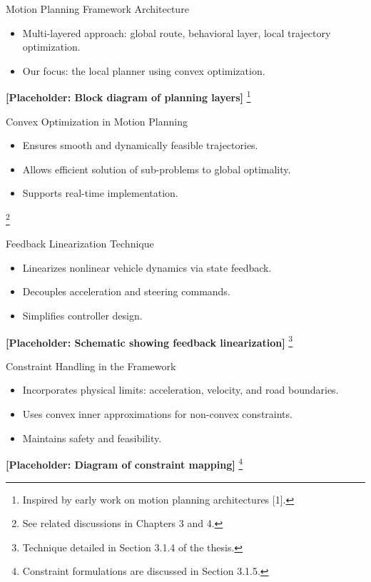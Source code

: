 \documentclass[shortpres,aspectratio=43]{beamer}
\newcommand\blfootnote[1]{%
  \begingroup
  \renewcommand\thefootnote{}\footnote{#1}%
  \addtocounter{footnote}{-1}%
  \endgroup
}
\begin{document}
\begin{frame}{Motion Planning Framework Architecture}
  \begin{itemize}
    \item Multi-layered approach: global route, behavioral layer, local trajectory optimization.
    \item Our focus: the local planner using convex optimization.
  \end{itemize}
  \centering
  \textbf{[Placeholder: Block diagram of planning layers]}
  \blfootnote{\tiny Inspired by early work on motion planning architectures [1].}
\end{frame}

\begin{frame}{Convex Optimization in Motion Planning}
  \begin{itemize}
    \item Ensures smooth and dynamically feasible trajectories.
    \item Allows efficient solution of sub-problems to global optimality.
    \item Supports real-time implementation.
  \end{itemize}
  \blfootnote{\tiny See related discussions in Chapters 3 and 4.}
\end{frame}

\begin{frame}{Feedback Linearization Technique}
  \begin{itemize}
    \item Linearizes nonlinear vehicle dynamics via state feedback.
    \item Decouples acceleration and steering commands.
    \item Simplifies controller design.
  \end{itemize}
  \centering
  \textbf{[Placeholder: Schematic showing feedback linearization]}
  \blfootnote{\tiny Technique detailed in Section 3.1.4 of the thesis.}
\end{frame}

\begin{frame}{Constraint Handling in the Framework}
  \begin{itemize}
    \item Incorporates physical limits: acceleration, velocity, and road boundaries.
    \item Uses convex inner approximations for non-convex constraints.
    \item Maintains safety and feasibility.
  \end{itemize}
  \centering
  \textbf{[Placeholder: Diagram of constraint mapping]}
  \blfootnote{\tiny Constraint formulations are discussed in Section 3.1.5.}
\end{frame}
\end{document}
